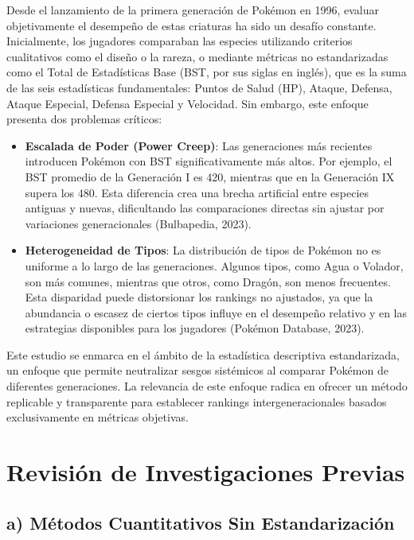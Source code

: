\documentclass[
]{article}
\providecommand{\tightlist}{%
  \setlength{\itemsep}{0pt}\setlength{\parskip}{0pt}}
\begin{document}
Desde el lanzamiento de la primera generación de Pokémon en 1996,
evaluar objetivamente el desempeño de estas criaturas ha sido un desafío
constante. Inicialmente, los jugadores comparaban las especies
utilizando criterios cualitativos como el diseño o la rareza, o mediante
métricas no estandarizadas como el Total de Estadísticas Base (BST, por
sus siglas en inglés), que es la suma de las seis estadísticas
fundamentales: Puntos de Salud (HP), Ataque, Defensa, Ataque Especial,
Defensa Especial y Velocidad. Sin embargo, este enfoque presenta dos
problemas críticos:

\begin{itemize}
\tightlist
\item
  \textbf{Escalada de Poder (Power Creep)}: Las generaciones más
  recientes introducen Pokémon con BST significativamente más altos. Por
  ejemplo, el BST promedio de la Generación I es 420, mientras que en la
  Generación IX supera los 480. Esta diferencia crea una brecha
  artificial entre especies antiguas y nuevas, dificultando las
  comparaciones directas sin ajustar por variaciones generacionales
  (Bulbapedia, 2023).
\item
  \textbf{Heterogeneidad de Tipos}: La distribución de tipos de Pokémon
  no es uniforme a lo largo de las generaciones. Algunos tipos, como
  Agua o Volador, son más comunes, mientras que otros, como Dragón, son
  menos frecuentes. Esta disparidad puede distorsionar los rankings no
  ajustados, ya que la abundancia o escasez de ciertos tipos influye en
  el desempeño relativo y en las estrategias disponibles para los
  jugadores (Pokémon Database, 2023).
\end{itemize}

Este estudio se enmarca en el ámbito de la estadística descriptiva
estandarizada, un enfoque que permite neutralizar sesgos sistémicos al
comparar Pokémon de diferentes generaciones. La relevancia de este
enfoque radica en ofrecer un método replicable y transparente para
establecer rankings intergeneracionales basados exclusivamente en
métricas objetivas.

\section{Revisión de Investigaciones
Previas}\label{revisiuxf3n-de-investigaciones-previas}

\subsection{a) Métodos Cuantitativos Sin
Estandarización}\label{a-muxe9todos-cuantitativos-sin-estandarizaciuxf3n}
\end{document}
